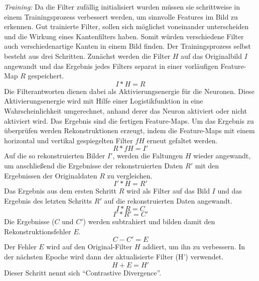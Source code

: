 \textit{Training:}
Da die Filter zufällig initialisiert wurden müssen sie schrittweise in einem Trainingsprozess verbessert werden, um sinnvolle Features im Bild zu erkennen.
Gut trainierte Filter, sollen sich möglichst voneinander unterscheiden und die Wirkung eines Kantenfilters haben.
Somit würden verschiedene Filter auch verschiedenartige Kanten in einem Bild finden.
Der Trainingsprozess selbst besteht aus drei Schritten.
Zunächst werden die Filter $H$ auf das Originalbild $I$ angewandt und das Ergebnis jedes Filters separat in einer vorläufigen Feature-Map $R$ gespeichert.
\begin{equation*}
I * H = R
\end{equation*}
Die Filterantworten dienen dabei als Aktivierungsenergie für die Neuronen.
Diese Aktivierungsenergie wird mit Hilfe einer Logistikfunktion in eine Wahrscheinlichkeit umgerechnet, anhand derer das Neuron aktiviert oder nicht aktiviert wird.
Das Ergebnis sind die fertigen Feature-Maps.
Um das Ergebnis zu überprüfen werden Rekonstruktionen erzeugt, indem die Feature-Maps mit einem horizontal und vertikal gespiegelten Filter $fH$ erneut gefaltet werden.
\begin{equation*}
R * fH = I'
\end{equation*}
Auf die so rekonstruierten Bilder $I'$, werden die Faltungen $H$ wieder angewandt, um anschließend die Ergebnisse der rekonstruierten Daten $R'$ mit den Ergebnissen der Originaldaten $R$ zu vergleichen.
\begin{equation*}
I' * H = R'
\end{equation*}
Das Ergebnis aus dem ersten Schritt $R$ wird als Filter auf das Bild $I$ und das Ergebnis des letzten Schritts $R'$ auf die rekonstruierten Daten angewandt.
\begin{equation*}
I * R = C
\end{equation*}
\begin{equation*}
I' * R' = C'
\end{equation*}
Die Ergebnisse ($C$ und $C'$) werden subtrahiert und bilden damit den Rekonstruktionsfehler $E$.
\begin{equation*}
C - C' = E
\end{equation*}
Der Fehler $E$ wird auf den Original-Filter $H$ addiert, um ihn zu verbessern.
In der nächsten Epoche wird dann der aktualisierte Filter (H') verwendet.
\begin{equation*}
H + E = H'
\end{equation*}
Dieser Schritt nennt sich "`Contrastive Divergence"'.

